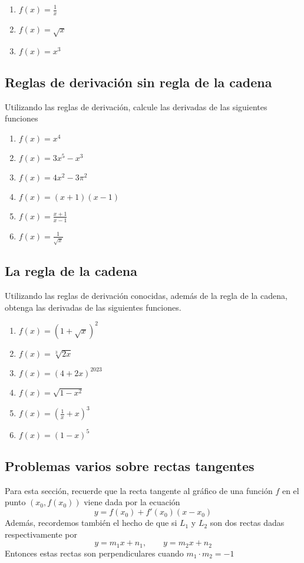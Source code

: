 \begin{enumerate}
    \item $f(x) = \frac{1}{x}$
    \item $f(x) = \sqrt{x}$
    \item $f(x) = x^3$
\end{enumerate}

\subsection{Reglas de derivación sin regla de la cadena}

Utilizando las reglas de derivación, calcule las derivadas de las siguientes funciones
\begin{multicols}{2}
    \begin{enumerate}
        \item $f(x) = x^4$
        \item $f(x) = 3x^5 - x^3$
        \item $f(x) = 4x^2 - 3\pi^2$
        \item $f(x) = (x+1)(x-1)$
        \item $f(x) = \frac{x+1}{x-1}$
        \item $f(x) = \frac{1}{\sqrt{x}}$
    \end{enumerate}
\end{multicols}

\subsection{La regla de la cadena}

Utilizando las reglas de derivación conocidas, además de la regla de la cadena, obtenga las derivadas de las siguientes funciones.
\begin{multicols}{3}
    \begin{enumerate}
        \item $f(x) = (1 + \sqrt{x})^2$
        \item $f(x) = \sqrt[3]{2x}$
        \item $f(x) = (4 + 2x)^{2023}$
        \item $f(x) = \sqrt{1 - x^2}$
        \item $f(x) = (\frac{1}{x} + x)^3$
        \item $f(x) = (1 - x)^5$
    \end{enumerate}
\end{multicols}

\subsection{Problemas varios sobre rectas tangentes}
Para esta sección, recuerde que la recta tangente al gráfico de una función $f$ en el punto $(x_0, f(x_0))$ viene dada por la ecuación
\[y = f(x_0) + f'(x_0)(x - x_0)\]
Además, recordemos también el hecho de que si $L_1$ y $L_2$ son dos rectas dadas respectivamente por
\[y = m_1 x + n_1, \qquad y = m_2 x + n_2\]
Entonces estas rectas son perpendiculares cuando $m_1 \cdot m_2 = -1$

